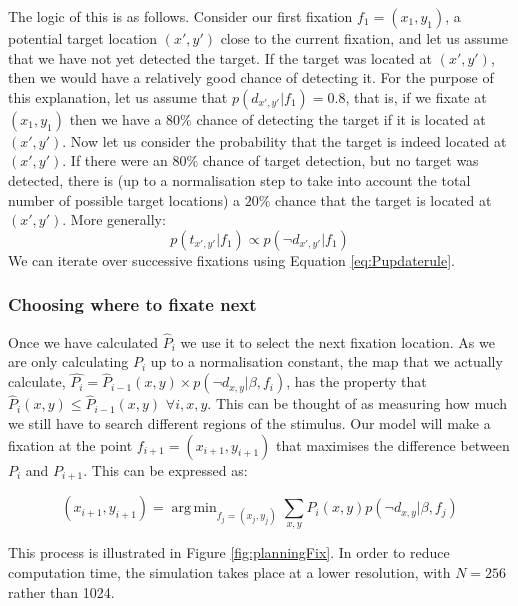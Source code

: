 \documentclass[preprint, authoryear]{elsarticle} %
\DeclareMathOperator*{\argmin}{arg\,min}
\begin{document}
The logic of this is as follows. Consider our first fixation $f_1 = (x_1,y_1)$, a potential target location $(x',y')$ close to the current fixation, and let us assume that we have not yet detected the target. If the target was located at $(x',y')$, then we would have a relatively good chance of detecting it. For the purpose of this explanation, let us assume that $p(d_{x',y'}|f_1)=0.8$, that is, if we fixate at $(x_1,y_1)$ then we have a $80\%$ chance of detecting the target if it is located at $(x',y')$. Now let us consider the probability that the target is indeed located at $(x',y')$. If there were an $80\%$ chance of target detection, but no target was detected, there is (up to a normalisation step to take into account the total number of possible target locations) a $20\%$ chance that the target is located at $(x',y')$. More generally:
\begin{equation}
p(t_{x',y'}|f_1) \propto p(\neg d_{x',y'}|f_1)
\end{equation}
We can iterate over successive fixations using Equation \ref{eq:Pupdaterule}.

\subsubsection{Choosing where to fixate next}

Once we have calculated $\hat{P}_i$ we use it to select the next fixation location. As we are only calculating $P_i$ up to a normalisation constant, the map that we actually calculate, $\hat{P_i} =  \hat{P}_{i-1}(x,y)\times p(\neg d_{x,y} | \beta, f_i)$, has the property that $\hat{P}_i(x,y)\leq\hat{P}_{i-1}(x,y)$ $\forall i,x,y$. This can be thought of as measuring how much we still have to search different regions of the stimulus. Our model will make a fixation at the point $f_{i+1}=(x_{i+1},y_{i+1})$ that maximises the difference between $P_i$ and $P_{i+1}$. This can be expressed as: 

\begin{equation}
(x_{i+1},y_{i+1}) = \argmin_{f_j=(x_j,y_j)}\sum_{x,y} P_i(x,y)p(\neg d_{x,y}|\beta, f_j)
\end{equation}

This process is illustrated in Figure \ref{fig:planningFix}. In order to reduce computation time, the simulation takes place at a lower resolution, with $N=256$ rather than 1024.
\end{document}
